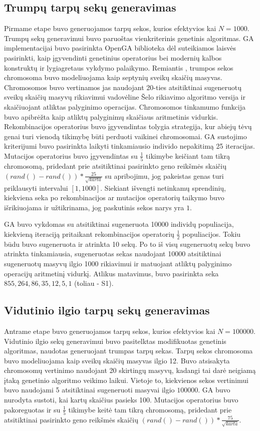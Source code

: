 \documentclass{VUMIFInfKursinis}
\begin{document}
\subsection{Trumpų tarpų sekų generavimas}
Pirmame etape buvo generuojamos tarpų sekos, kurios efektyvios kai $N=1000$.
Trumpų sekų generavimui buvo paruoštas vienkriterinis genetinis algoritmas.
GA implementacijai buvo pasirinkta OpenGA biblioteka \cite{mohammadi2017openga}
dėl suteikiamos laisvės pasirinkti, kaip įgyvendinti genetinius operatorius bei modernių kalbos konstruktų ir lygiagretaus vykdymo palaikymo.
Remiantis \cite{simpson1999faster}, trumpos sekos chromosoma buvo modeliuojama kaip
septynių sveikų skaičių masyvas.
Chromosomos buvo vertinamos jas naudojant 20-ties atsitiktinai
sugeneruotų sveikų skaičių masyvų rikiavimui vadovėline Šelo rikiavimo algoritmo versija ir skaičiuojant atliktas palyginimo operacijas.
Chromosomos tinkamumo funkcija buvo apibrėžta kaip atliktų palyginimų skaičiaus aritmetinis vidurkis.
Rekombinacijos operatorius buvo įgyvendintas tolygia strategija, kur abiejų tėvų genai turi vienodą tikimybę
būti perduoti vaikinei chromosomai.
GA sustojimo kriterijumi buvo pasirinkta laikyti tinkamiausio individo nepakitimą 25 iteracijas.
Mutacijos operatorius buvo įgyvendintas su $\frac{1}{5}$ tikimybe keičiant tam tikrą chromosomą,
pridedant prie atsitiktinai pasirinkto geno reikšmės skaičių $(rand()-rand())*\frac{25}{\sqrt{karta}}$ su apribojimu, jog pakeistas genas turi priklausyti intervalui $[1, 1000]$.
Siekiant išvengti netinkamų sprendinių, kiekviena seka po rekombinacijos ar mutacijos operatorių taikymo buvo išrikiuojama ir
užtikrinama, jog paskutinis sekos narys yra $1$.

GA buvo vykdomas su atsitiktinai sugeneruota 10000 individų populiacija, kiekvieną iteraciją pritaikant rekombinacijos operatorių
$\frac{1}{2}$ populiacijos.
Tokiu būdu buvo sugeneruota ir atrinkta 10 sekų.
Po to iš visų sugeneruotų sekų buvo atrinkta tinkamiausia, sugeneruotas sekas naudojant 10000 atsitiktinai sugeneruotų masyvų ilgio 1000 rikiavimui
ir matuojant atliktų palyginimo operacijų aritmetinį vidurkį.
Atlikus matavimus, buvo pasirinkta seka $855, 264, 86, 35, 12, 5, 1$ (toliau - S1).

\subsection{Vidutinio ilgio tarpų sekų generavimas}
Antrame etape buvo generuojamos tarpų sekos, kurios efektyvios kai $N=100000$.
Vidutinio ilgio sekų generavimui buvo pasitelktas modifikuotas genetinis algoritmas, naudotas generuojant trumpas tarpų sekas.
Tarpų sekos chromosoma buvo modeliuojama kaip sveikų skaičių masyvas ilgio 12.
Buvo atsisakyta chromosomų vertinimo naudojant 20 skirtingų masyvų, kadangi tai darė neigiamą įtaką genetinio algoritmo veikimo laikui.
Vietoje to, kiekvienos sekos vertinimui buvo naudojami 5 atsitiktinai sugeneruoti masyvai ilgio $100000$.
GA buvo nurodyta sustoti, kai kartų skaičius pasieks 100.
Mutacijos operatorius buvo pakoreguotas ir su $\frac{1}{5}$ tikimybe keitė tam tikrą chromosomą,
pridedant prie atsitiktinai pasirinkto geno reikšmės skaičių $(rand()-rand())*\frac{75}{\sqrt{karta}}$.
\end{document}
